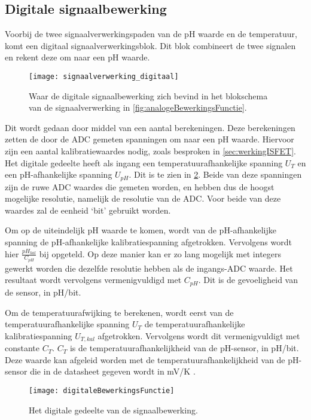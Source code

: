 \subsection{Digitale signaalbewerking}\label{sec:digitaal}

Voorbij de twee signaalverwerkingspaden van de pH waarde en de temperatuur, komt een digitaal signaalverwerkingsblok. Dit blok combineert de twee signalen en rekent deze om naar een pH waarde.
\begin{figure}[!htbp]
    \centering
    \texttt{[image: signaalverwerking\_digitaal]}
    \caption{Waar de digitale signaalbewerking zich bevind in het blokschema van de signaalverwerking in \cref{fig:analogeBewerkingsFunctie}.}
    \label{fig:digitaalInSchema}
\end{figure}

Dit wordt gedaan door middel van een aantal berekeningen. Deze berekeningen zetten de door de ADC gemeten spanningen om naar een pH waarde. Hiervoor zijn een aantal kalibratiewaardes nodig, zoals besproken in \cref{sec:werkingISFET}. Het digitale gedeelte heeft als ingang een temperatuurafhankelijke spanning $U_T$ en een pH-afhankelijke spanning $U_{pH}$. Dit is te zien in \cref{fig:digitaleBewerkingsFunctie}. Beide van deze spanningen zijn de ruwe ADC waardes die gemeten worden, en hebben dus de hoogst mogelijke resolutie, namelijk de resolutie van de ADC. Voor beide van deze waardes zal de eenheid `bit' gebruikt worden.

Om op de uiteindelijk pH waarde te komen, wordt van de pH-afhankelijke spanning de pH-afhankelijke kalibratiespanning afgetrokken. Vervolgens wordt hier $\frac{pH_{kal}}{C_{pH}}$ bij opgeteld. Op deze manier kan er zo lang mogelijk met integers gewerkt worden die dezelfde resolutie hebben als de ingangs-ADC waarde. Het resultaat wordt vervolgens vermenigvuldigd met $C_{pH}$. Dit is de gevoeligheid van de sensor, in pH/bit.

Om de temperatuurafwijking te berekenen, wordt eerst van de temperatuurafhankelijke spanning $U_T$ de temperatuurafhankelijke kalibratiespanning $U_{T,kal}$ afgetrokken. Vervolgens wordt dit vermenigvuldigt met constante $C_T$. $C_T$ is de temperatuurafhankelijkheid van de pH-sensor, in pH/bit. Deze waarde kan afgeleid worden met de temperatuurafhankelijkheid van de pH-sensor die in de datasheet gegeven wordt in mV/K \cite{isfet}.

\begin{figure}[!htbp]
    \centering
    \texttt{[image: digitaleBewerkingsFunctie]}
    \caption{Het digitale gedeelte van de signaalbewerking.}
    \label{fig:digitaleBewerkingsFunctie}
\end{figure}